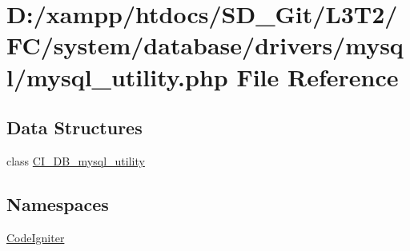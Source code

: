 \hypertarget{system_2database_2drivers_2mysql_2mysql__utility_8php}{}\section{D\+:/xampp/htdocs/\+S\+D\+\_\+\+Git/\+L3\+T2/\+F\+C/system/database/drivers/mysql/mysql\+\_\+utility.php File Reference}
\label{system_2database_2drivers_2mysql_2mysql__utility_8php}
\subsection*{Data Structures}
\begin{DoxyCompactItemize}
\item 
class \hyperlink{class_c_i___d_b__mysql__utility}{C\+I\+\_\+\+D\+B\+\_\+mysql\+\_\+utility}
\end{DoxyCompactItemize}
\subsection*{Namespaces}
\begin{DoxyCompactItemize}
\item 
 \hyperlink{namespace_code_igniter}{Code\+Igniter}
\end{DoxyCompactItemize}
